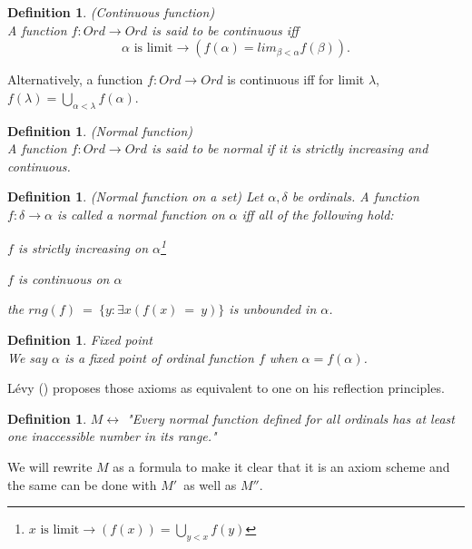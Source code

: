 \documentclass[12pt,a4paper]{article}
\newtheorem{definition}[theorem]{Definition}
\renewcommand{\iff}{\leftrightarrow}
\newcommand{\then}{\rightarrow}
\newcommand{\bce}{\begin{compactenum}}
\newcommand{\ece}{\end{compactenum}}
\begin{document}
\begin{definition}{(Continuous function)}\label{def:continuous_function}\\
A function $f: Ord \then Ord$ is said to be \emph{continuous} iff
\begin{equation}
\alpha\mbox{ is limit} \then (f(\alpha) = lim_{\beta < \alpha} f(\beta)).
\end{equation}
\end{definition}
Alternatively, a function $f: Ord \then Ord$ is continuous iff for limit $\lambda$, $f(\lambda) = \bigcup_{\alpha < \lambda} f(\alpha)$.

\begin{definition}{(Normal function)}\label{def:normal_function}\\
A function $f: Ord \then Ord$ is said to be \emph{normal} if it is \emph{strictly increasing} and \emph{continuous}.
\end{definition}

\begin{definition}{(Normal function on a set)} Let $\alpha, \delta$ be ordinals. A function $f: \delta \then \alpha$ is called a \emph{normal function on $\alpha$} iff all of the following hold:
\bce[(i)]
\item $f$ is strictly increasing on $\alpha$\footnote{$x \mbox{ is limit} \then (f(x)) = \bigcup_{y < x} f(y)$}
\item $f$ is continuous on $\alpha$
\item the $rng(f)\ =\ \{y: \exists x(f(x)\ =\ y)\}$ is unbounded in $\alpha$.
 \ece
\end{definition} %

\begin{definition}{Fixed point}\\
We say $\alpha$ is a fixed point of ordinal function $f$ when $\alpha=f(\alpha)$.
\end{definition}

Lévy (\cite{Levy60a}) proposes those axioms as equivalent to one on his reflection principles.
\begin{definition}
$M \iff$ "Every normal function defined for all ordinals has at least one inaccessible number in its range."
\end{definition}
We will rewrite $M$ as a formula to make it clear that it is an axiom scheme and the same can be done with $M'$ as well as $M''$.
\end{document}
